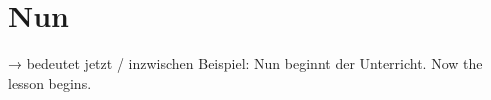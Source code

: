 \documentclass[a4paper]{article}
\title{}
\date{}
\begin{document}
    \maketitle
    
    
    \section{Nun}
        → bedeutet jetzt / inzwischen
        Beispiel:
        Nun beginnt der Unterricht.
        Now the lesson begins.
\end{document}
